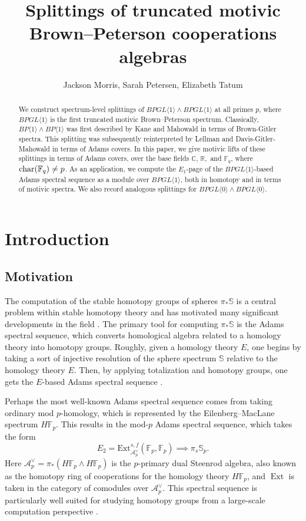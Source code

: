 \documentclass{amsart}
\title{Splittings of truncated motivic Brown--Peterson cooperations algebras}
\author{Jackson Morris, Sarah Petersen, Elizabeth Tatum}
\theoremstyle{plain}
\numberwithin{theorem}{section}
\numberwithin{equation}{section}
\numberwithin{figure}{section}
\DeclareMathOperator{\Ext}{Ext}
\newcommand{\mC}{{\mathbb C}}
\newcommand{\mF}{{\mathbb F}}
\newcommand{\mR}{{\mathbb R}}
\newcommand{\mS}{{\mathbb S}}
\newcommand{\0}{\langle 0 \rangle }
\begin{document}
\begin{abstract}
    We construct spectrum-level splittings of $BPGL \langle 1 \rangle \wedge BPGL \langle 1 \rangle$ at all primes $p$, where $BPGL \langle 1 \rangle$ is the first truncated motivic Brown--Peterson spectrum. Classically, $BP\langle 1 \rangle \wedge BP\langle 1 \rangle$ was first described by Kane and Mahowald in terms of Brown-Gitler spectra. This splitting was subsequently reinterpreted by Lellman and Davis-Gitler-Mahowald in terms of Adams covers. In this paper, we give motivic lifts of these splittings in terms of Adams covers, over the base fields $\mC, \, \mR,$ and $\mF_q$, where $\textup{char}(\mathbb{F}_q) \neq p$. As an application, we compute the $E_1$-page of the $BPGL\langle 1 \rangle$-based Adams spectral sequence as a module over $BPGL\langle 1 \rangle$, both in homotopy and in terms of motivic spectra. We also record analogous splittings for $BPGL \langle 0 \rangle \wedge BPGL \langle 0 \rangle$.
\end{abstract}

\maketitle
\tableofcontents

\section{Introduction} \label{sec:Intro}
\subsection{Motivation} 
The computation of the stable homotopy groups of spheres $\pi_* \mS$ is a central problem within stable homotopy theory and has motivated many significant developments in the field \cite{Adams66, DevHopSmi88,IsaWanXu23}. The primary tool for computing $\pi_*\mathbb{S}$ is the Adams spectral sequence, which converts homological algebra related to a homology theory into homotopy groups. Roughly, given a homology theory $E$, one begins by taking a sort of injective resolution of the sphere spectrum $\mathbb{S}$ relative to the homology theory $E$. Then, by applying totalization and homotopy groups, one gets the $E$-based Adams spectral sequence \cite{Rav86}.

Perhaps the most well-known Adams spectral sequence comes from taking ordinary mod $p$-homology, which is represented by the Eilenberg--MacLane spectrum $H\mathbb{F}_p$. This results in the mod-$p$ Adams spectral sequence, which takes the form
\[E_2 = \text{Ext}^{s,f}_{\mathcal{A}_p^\vee}(\mathbb{F}_p, \mathbb{F}_p) \implies \pi_s\mathbb{S}_p.\]
Here $\mathcal{A}_p^\vee = \pi_*(H\mathbb{F}_p \wedge H\mathbb{F}_p)$ is the $p$-primary dual Steenrod algebra, also known as the homotopy ring of cooperations for the homology theory $H\mathbb{F}_p$, and $\Ext$ is taken in the category of comodules over $\mathcal{A}^\vee_p$. This spectral sequence is particularly well suited for studying homotopy groups from a large-scale computation perspective \cite{linWanXu25}. 
\end{document}
